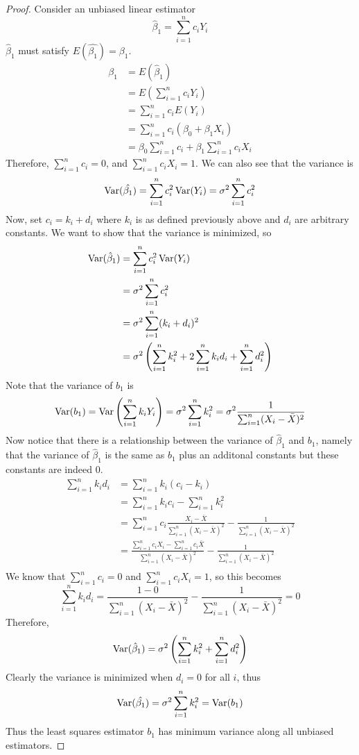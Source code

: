 \begin{proof}
    Consider an unbiased linear estimator 
    \[\hat{\beta}_1 = \sum_{i=1}^n c_iY_i\]
    $\hat{\beta}_1$ must satisfy $E(\hat{\beta_1}) = \beta_1$.
    \begin{align*}
        \beta_1 &= E(\hat{\beta}_1)\\
        &= E\left(\sum_{i=1}^n c_i Y_i\right)\\
        &= \sum_{i=1}^n c_i E(Y_i)\\
        &= \sum_{i=1}^n c_i(\beta_0 + \beta_1 X_i)\\
        &= \beta_0\sum_{i=1}^n c_i + \beta_1\sum_{i=1}^n c_iX_i  
    \end{align*}
    Therefore, $\sum\limits_{i=1}^n c_i = 0$, and $\sum\limits_{i=1}^n c_iX_i = 1$. We can also see that the variance is 
    \[\operatorname{Var}(\hat{\beta_1}) = \sum_{i=1}^n c_i^2 \operatorname{Var}(Y_i) = \sigma^2\sum_{i=1}^n c_i^2\]
    Now, set $c_i = k_i + d_i$ where $k_i$ is as defined previously above and $d_i$ are arbitrary constants. We want to show that the variance is minimized, so 
    \begin{align*}
        \operatorname{Var}(\hat{\beta}_1) &= \sum_{i=1}^n c_i^2\operatorname{Var}(Y_i)\\
        &= \sigma^2\sum_{i=1}^n c_i^2\\
        &= \sigma^2\sum_{i=1}^n (k_i + d_i)^2\\
        &= \sigma^2 \left(\sum_{i=1}^n k_i^2 + 2\sum_{i=1}^n k_id_i + \sum_{i=1}^n d_i^2\right)
    \end{align*}
    Note that the variance of $b_1$ is 
    \[\operatorname{Var}(b_1) = \operatorname{Var}\left(\sum_{i=1}^n k_iY_i\right) = \sigma^2 \sum_{i=1}^n k_i^2 = \sigma^2 \frac{1}{\sum_{i=1}^n (X_i - \bar{X})^2}\]
    Now notice that there is a relationship between the variance of $\hat{\beta}_1$ and $b_1$, namely that the variance of $\hat{\beta}_1$ is the same as $b_1$ plus an additonal constants but these constants are indeed 0. 
    \begin{align*}
        \sum_{i=1}^n k_id_i &= \sum_{i=1}^n k_i(c_i - k_i)\\
        &= \sum_{i=1}^n k_ic_i - \sum_{i=1}^n k_i^2\\
        &= \sum_{i=1}^n c_i \frac{X_i - \bar{X}}{\sum_{i=1}^n (X_i - \bar{X})^2} - \frac{1}{\sum_{i=1}^n (X_i - \bar{X})^2}\\
        &= \frac{\sum_{i=1}^n c_iX_i  - \sum_{i=1}^n c_i\bar{X}}{\sum_{i=1}^n (X_i - \bar{X})^2} - \frac{1}{\sum_{i=1}^n (X_i - \bar{X})^2}\\
    \end{align*}
    We know that $\sum_{i=1}^n c_i = 0$ and $\sum_{i=1}^n c_i X_i = 1$, so this becomes
    \[\sum_{i=1}^n k_id_i = \frac{1 - 0}{\sum_{i=1}^n (X_i - \bar{X})^2} - \frac{1}{\sum_{i=1}^n (X_i - \bar{X})^2} = 0\]
    Therefore, 
    \[\operatorname{Var}(\hat{\beta}_1) = \sigma^2 \left(\sum_{i=1}^n k_i^2 + \sum_{i=1}^n d_i^2\right)\]
    Clearly the variance is minimized when $d_i = 0$ for all $i$, thus 
    \[\operatorname{Var}(\hat{\beta_1}) = \sigma^2 \sum_{i=1}^n k_i^2 = \operatorname{Var}(b_1)\]
    Thus the least squares estimator $b_1$ has minimum variance along all unbiased estimators.
\end{proof}

